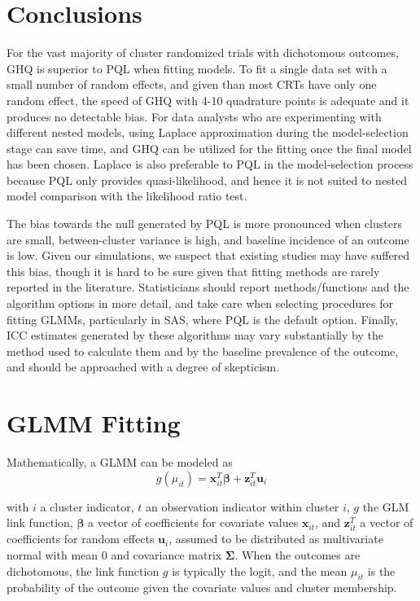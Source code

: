 \documentclass{article}
\begin{document}
\begin{flushleft}
\section{Conclusions}

For the vast majority of cluster randomized trials with dichotomous outcomes, GHQ is superior to PQL when fitting models. To fit a single data set with a small number of random effects, and given than most CRTs have only one random effect, the speed of GHQ with 4-10 quadrature points is adequate and it produces no detectable bias. For data analysts who are experimenting with different nested models, using Laplace approximation during the model-selection stage can save time, and GHQ can be utilized for the fitting once the final model has been chosen. Laplace is also preferable to PQL in the model-selection process because PQL only provides quasi-likelihood, and hence it is not suited to nested model comparison with the likelihood ratio test.

The bias towards the null generated by PQL is more pronounced when clusters are small, between-cluster variance is high, and baseline incidence of an outcome is low. Given our simulations, we suspect that existing studies may have suffered this bias, though it is hard to be sure given that fitting methods are rarely reported in the literature. Statisticians should report methods/functions and the algorithm options in more detail, and take care when selecting procedures for fitting GLMMs, particularly in SAS, where PQL is the default option. Finally, ICC estimates generated by these algorithms may vary substantially by the method used to calculate them and by the baseline prevalence of the outcome, and should be approached with a degree of skepticism.

\appendix
\section{GLMM Fitting}
Mathematically, a GLMM can be modeled as
    \begin{equation}
        g(\mu_{it})=\mathbf{x}^T_{it} \boldsymbol{\beta} + \mathbf{z}^T_{it}\mathbf{u}_i
    \end{equation}
    
    with
 $i$ a cluster indicator, $t$ an observation indicator within cluster $i$, $g$ the GLM link function, $\boldsymbol{\beta}$ a vector of coefficients for covariate values $\mathbf{x}_{it}$, and $\mathbf{z}^T_{it}$ a vector of coefficients for random effects $\mathbf{u}_i$, assumed to be distributed as multivariate normal with mean $0$ and covariance matrix $\mathbf{\Sigma}$. When the outcomes are dichotomous, the link function $g$ is typically the logit, and the mean $\mu_{it}$ is the probability of the outcome given the covariate values and cluster membership.
 

\end{flushleft}
\end{document}
